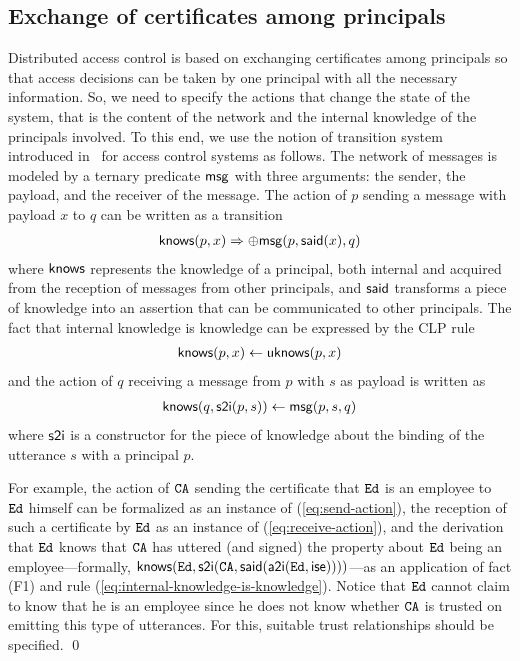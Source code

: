 \documentclass[conference]{llncs}
\newcommand{\theCA}{\ensuremath \mathtt{CA}}
\newcommand{\Ed}{\ensuremath \mathtt{Ed}}
\newcommand{\isemployee}{\ensuremath \mathsf{ise}}
\newcommand{\know}{\ensuremath \mathsf{knows}}
\newcommand{\msg}{\ensuremath \mathsf{msg}}
\newcommand{\atoi}{\ensuremath \mathsf{a2i}}
\newcommand{\stoi}{\ensuremath \mathsf{s2i}}
\newcommand{\knowzero}{\ensuremath \mathsf{uknows}}
\newcommand{\said}{\ensuremath \mathsf{said}}
\begin{document}
\subsection{Exchange of certificates among principals} 
\label{subsec:exchangecerts}
Distributed access control is based on exchanging  certificates among principals
so that access decisions can be taken by one principal with all the necessary information. 
So, we need to specify the actions that change the state of the system,
that is the content of the network and the internal knowledge of the principals involved. 
To this end, we use the notion of transition system introduced in~\cite{lietal2005} for
access control systems as follows. The network of messages is modeled by
a ternary predicate $\msg$ with three arguments: the sender, the payload, and
the receiver of the message. The action of $p$ sending a message with
payload $x$ to $q$ can be written as a transition
\begin{eqnarray}
  \label{eq:send-action}
  \know(p,x) \Rightarrow \oplus\msg(p,\said(x),q)
\end{eqnarray}
where $\know$ represents the knowledge of a principal, both
internal and acquired from the reception of messages from other
principals, and $\said$ transforms a piece of knowledge into an
assertion that can be communicated to other principals.  The fact that
internal knowledge is knowledge can be expressed by the CLP rule
\begin{eqnarray}
  \label{eq:internal-knowledge-is-knowledge}
  \know(p,x) \leftarrow \knowzero(p,x)
\end{eqnarray}
and the action of $q$ receiving a message from $p$ with $s$ as payload
is written as
\begin{eqnarray}
  \label{eq:receive-action}
  \know(q,\stoi(p,s)) \leftarrow \msg(p,s,q)
\end{eqnarray}
where $\stoi$ is a constructor for the piece of knowledge about the
binding of the utterance $s$ with a principal $p$.  
\begin{example}
\label{ex:certs}
For example, the action of $\theCA$ sending the certificate that $\Ed$
is an employee to $\Ed$ himself can be formalized as an instance of
(\ref{eq:send-action}), the reception of such a certificate by $\Ed$
as an instance of (\ref{eq:receive-action}), and the derivation that
$\Ed$ knows that $\theCA$ has uttered (and signed) the property about
$\Ed$ being an employee---formally,
$\know(\Ed,\stoi(\theCA,\said(\atoi(\Ed,\isemployee))))$---as an
application of fact (F1) and rule
(\ref{eq:internal-knowledge-is-knowledge}).
Notice that $\Ed$ cannot claim to know that he is an employee since he
does not know whether $\theCA$ is trusted on emitting this type of
utterances.  For this, suitable trust relationships should be
specified. \qed
\end{example}
\end{document}
